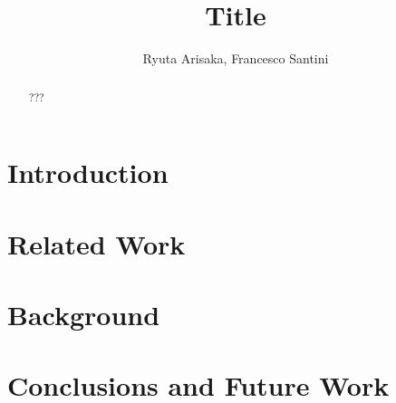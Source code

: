 \documentclass{llncs}%
\begin{document}
\title{Title}

\author{Ryuta Arisaka, Francesco Santini}

\maketitle

\begin{abstract}
???
\end{abstract}



\section{Introduction}\label{sec:intro}





\section{Related Work}\label{sec:related}




\section{Background}\label{sec:bg}



\section{Conclusions and Future Work}\label{sec:conclusion}








\end{document}
